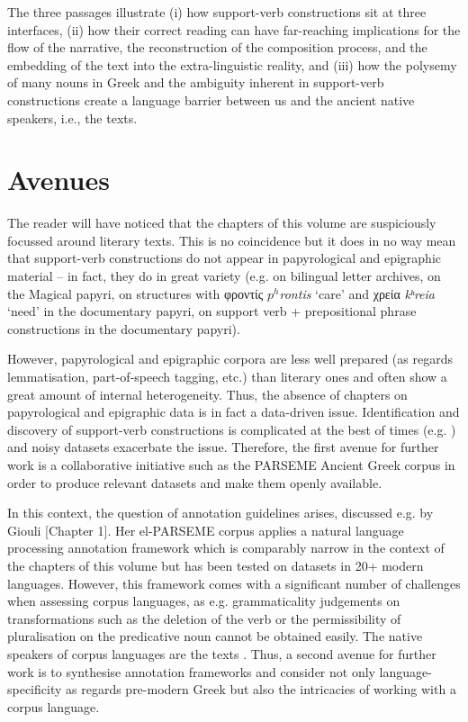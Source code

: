 \documentclass[output=paper,colorlinks,citecolor=brown]{langscibook}
\begin{document}
The three passages illustrate (i) how support-verb constructions sit at three interfaces, (ii) how their correct reading can have far-reaching implications for the flow of the narrative, the reconstruction of the composition process, and the embedding of the text into the extra-linguistic reality, and (iii) how the polysemy of many nouns in Greek and the ambiguity inherent in support-verb constructions create a language barrier between us and the ancient native speakers, i.e., the texts. 


\section{Avenues}
The reader will have noticed that the chapters of this volume are suspiciously focussed around literary texts. This is no coincidence but it does in no way mean that support-verb constructions do not appear in papyrological and epigraphic material – in fact, they do in great variety (e.g. \citealt{fendelGreekEgyptEgyptian2021, fendelCopticInterferenceSyntax2022, fendelSupportverbConstructionsObjects2023} on bilingual letter archives, \citealt{fendelSupportverbConstructionsMagicalsubmitted} on the Magical papyri, \citealt{fendelTakingStockGreek2024} on structures with φροντίς \textit{$p^h$rontis} ‘care' and χρεία \textit{kʰreia} ‘need' in the documentary papyri, \citealt{FendelPPSVC} on support verb + prepositional phrase constructions in the documentary papyri).


However, papyrological and epigraphic corpora are less well prepared (as regards lemmatisation, part-of-speech tagging, etc.) than literary ones and often show a great amount of internal heterogeneity. Thus, the absence of chapters on papyrological and epigraphic data is in fact a data-driven issue. Identification and discovery of support-verb constructions is complicated at the best of times (e.g. \citealt{doucetNonContiguousWordSequences2004, sagMultiwordExpressionsPain2002}) and noisy datasets exacerbate the issue. Therefore, the first avenue for further work is a collaborative initiative such as the PARSEME Ancient Greek corpus in order to produce relevant datasets and make them openly available. 


In this context, the question of annotation guidelines arises, discussed e.g. by Giouli [Chapter 1]. Her el-PARSEME corpus applies a natural language processing annotation framework which is comparably narrow in the context of the chapters of this volume but has been tested on datasets in 20+ modern languages. However, this framework comes with a significant number of challenges when assessing corpus languages, as e.g. grammaticality judgements on transformations such as the deletion of the verb or the permissibility of pluralisation on the predicative noun cannot be obtained easily. The native speakers of corpus languages are the texts \citep{fleischmanMethodologiesIdeologiesHistorical2000}. Thus, a second avenue for further work is to synthesise annotation frameworks and consider not only language-specificity as regards pre-modern Greek but also the intricacies of working with a corpus language.
\end{document}
